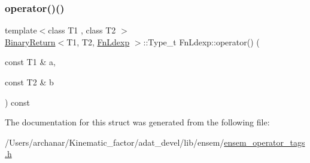 \mbox{\label{structFnLdexp_af369e8f8d69893a25d9ea27c59ff4d02}} 
\subsubsection{\texorpdfstring{operator()()}{operator()()}\hspace{0.1cm}{\footnotesize\ttfamily [2/2]}}
{\footnotesize\ttfamily template$<$class T1 , class T2 $>$ \\
\mbox{\hyperlink{structBinaryReturn}{Binary\+Return}}$<$T1, T2, \mbox{\hyperlink{structFnLdexp}{Fn\+Ldexp}} $>$\+::Type\+\_\+t Fn\+Ldexp\+::operator() (\begin{DoxyParamCaption}\item[{const T1 \&}]{a,  }\item[{const T2 \&}]{b }\end{DoxyParamCaption}) const\hspace{0.3cm}{\ttfamily [inline]}}



The documentation for this struct was generated from the following file\+:\begin{DoxyCompactItemize}
\item 
/\+Users/archanar/\+Kinematic\+\_\+factor/adat\+\_\+devel/lib/ensem/\mbox{\hyperlink{lib_2ensem_2ensem__operator__tags_8h}{ensem\+\_\+operator\+\_\+tags.\+h}}\end{DoxyCompactItemize}
